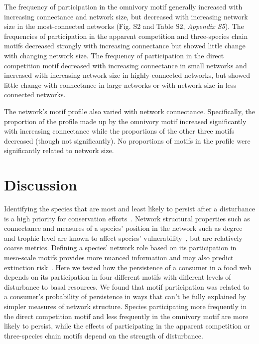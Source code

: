 \documentclass[12pt]{article}
\begin{document}
\begin{spacing}{2.0}
        
        The frequency of participation in the omnivory motif generally increased with increasing connectance and network size, but decreased with increasing network size in the most-connected networks (Fig. S2 and Table S2, \emph{Appendix S5}).
        The frequencies of participation in the apparent competition and three-species chain motifs decreased strongly with increasing connectance but showed little change with changing network size.
        The frequency of participation in the direct competition motif decreased with increasing connectance in small networks and increased with increasing network size in highly-connected networks, but showed little change with connectance in large networks or with network size in less-connected networks.

        
        The network's motif profile also varied with network connectance.
        Specifically, the proportion of the profile made up by the omnivory motif increased significantly  with increasing connectance while the proportions of the other three motifs decreased (though not significantly).
        No proportions of motifs in the profile were significantly related to network size.


\section*{Discussion}

    Identifying the species that are most and least likely to persist after a disturbance is a high priority for conservation efforts~\citep{Bottrilletal2008}. 
    Network structural properties such as connectance and measures of a species' position in the network such as degree and trophic level are known to affect species' vulnerability~\citep{Dunne2002, Eklof2006, PascualDunne2006,prill2005dynamic, bascompte2005simple,curtsdotter2011robustness, dunne2009cascading, Eklof2006}, but are relatively coarse metrics.
    Defining a species' network role based on its participation in meso-scale motifs provides more nuanced information and may also predict extinction risk~\citep{}.
    Here we tested how the persistence of a consumer in a food web depends on its participation in four different motifs with different levels of disturbance to basal resources.  
    We found that motif participation was related to a consumer's probability of persistence in ways that can't be fully explained by simpler measures of network structure. 
    Species participating more frequently in the direct competition motif and less frequently in the omnivory motif are more likely to persist, while the effects of participating in the apparent competition or three-species chain motifs depend on the strength of disturbance.



\end{spacing}
\end{document}

